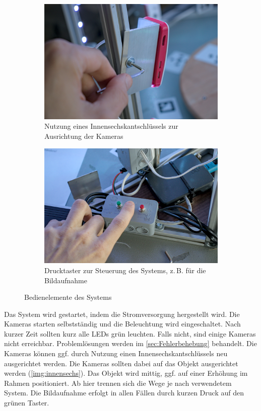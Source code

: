 \documentclass[./00PhotoBox.tex]{subfiles}
\begin{document}
\begin{figure}
    \centering
    \begin{subfigure}{0.48\textwidth}
        \includegraphics[width=1\textwidth]{img/9_anleitung/innensechs.jpg}
        \caption{Nutzung eines Innensechskantschlüssels zur Ausrichtung der Kameras}
        \label{img:innensechs}
    \end{subfigure}
    \begin{subfigure}{0.48\textwidth}
        \includegraphics[width=1\textwidth]{img/9_anleitung/taster.jpg}
        \caption{Drucktaster zur Steuerung des Systems, z.\,B. für die Bildaufnahme}
        \label{img:taster}
    \end{subfigure}
    \caption{Bedienelemente des Systems}
\end{figure}

Das System wird gestartet, indem die Stromversorgung hergestellt wird. Die Kameras starten selbstständig und die Beleuchtung wird eingeschaltet. Nach kurzer Zeit sollten kurz alle LEDs grün leuchten. Falls nicht, sind einige Kameras nicht erreichbar. Problemlösungen werden im \autoref{sec:Fehlerbehebung} behandelt. Die Kameras können ggf. durch Nutzung einen Innensechskantschlüssels neu ausgerichtet werden. Die Kameras sollten dabei auf das Objekt ausgerichtet werden (\autoref{img:innensechs}).
Das Objekt wird mittig, ggf. auf einer Erhöhung im Rahmen positioniert.
Ab hier trennen sich die Wege je nach verwendetem System. Die Bildaufnahme erfolgt in allen Fällen durch kurzen Druck auf den grünen Taster.
\end{document}
